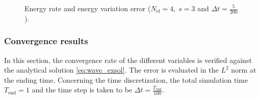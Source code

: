 \documentclass{elsarticle}
\begin{document}
\begin{figure}[p]%
\centering
{}%
%
\caption{Energy rate and energy variation error ($N_{\text{el}}=4,\; s=3$ and $\Delta t = \frac{5}{200}$).}%
\label{fig:energy_wave}%
\end{figure}

\subsubsection{Convergence results}
In this section, the convergence rate of the different variables is verified against the analytical solution \eqref{eq:wave_exsol}.  The error is evaluated in the $L^2$ norm at the ending time. Concerning the time discretization, the total simulation time $T_{\text{end}}=1$ and the time step is taken to be $\Delta t= \frac{T_{\text{end}}}{100}$. \\
\end{document}
